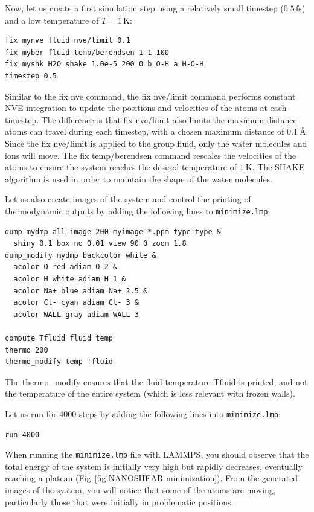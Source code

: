 \documentclass[9pt,tutorial]{livecoms}
\newcommand{\lmpcmd}[1]{\hspace{0pt}\colorbox{listing}{\textcolor{command}{\small{#1}}}\hspace{0pt}} %
\newcommand{\flecmd}[1]{\textcolor{command}{\texttt{#1}}} %
\begin{document}
Now, let us create a first simulation step using a relatively small
timestep ($0.5\,\text{fs}$) and a low temperature of $T = 1\,\text{K}$:
\begin{lstlisting}
fix mynve fluid nve/limit 0.1
fix myber fluid temp/berendsen 1 1 100
fix myshk H2O shake 1.0e-5 200 0 b O-H a H-O-H
timestep 0.5
\end{lstlisting}
Similar to the \lmpcmd{fix nve} command, the \lmpcmd{fix nve/limit} command performs constant
NVE integration to update the positions and velocities of the atoms at each
timestep.  The difference is that \lmpcmd{fix nve/limit} also limits the maximum
distance atoms can travel during each timestep, with a chosen maximum distance
of $0.1~\text{\AA{}}$.  Since the \lmpcmd{fix nve/limit} is applied to the
group \lmpcmd{fluid}, only the water molecules and ions will move.
The \lmpcmd{fix temp/berendsen} command rescales the velocities of the atoms
to ensure the system reaches the desired temperature of $1~\text{K}$.
The SHAKE algorithm is used in order to maintain the shape of the water molecules.

Let us also create images of the system and control
the printing of thermodynamic outputs by adding the following lines
to \flecmd{minimize.lmp}:
\begin{lstlisting}
dump mydmp all image 200 myimage-*.ppm type type &
  shiny 0.1 box no 0.01 view 90 0 zoom 1.8
dump_modify mydmp backcolor white &
  acolor O red adiam O 2 &
  acolor H white adiam H 1 &
  acolor Na+ blue adiam Na+ 2.5 &
  acolor Cl- cyan adiam Cl- 3 &
  acolor WALL gray adiam WALL 3

compute Tfluid fluid temp
thermo 200
thermo_modify temp Tfluid
\end{lstlisting}
The \lmpcmd{thermo\_modify} ensures that the fluid temperature \lmpcmd{Tfluid}
is printed, and not the temperature of the entire system (which is less relevant
with frozen walls).

Let us run for 4000 steps by adding the following lines into \flecmd{minimize.lmp}:
\begin{lstlisting}
run 4000
\end{lstlisting}
When running the \flecmd{minimize.lmp} file with LAMMPS, you should observe that the
total energy of the system is initially very high but rapidly decreases,
eventually reaching a plateau (Fig.\,\ref{fig:NANOSHEAR-minimization}).  From the generated
images of the system, you will notice that some of the atoms are moving, particularly
those that were initially in problematic positions.
\end{document}
